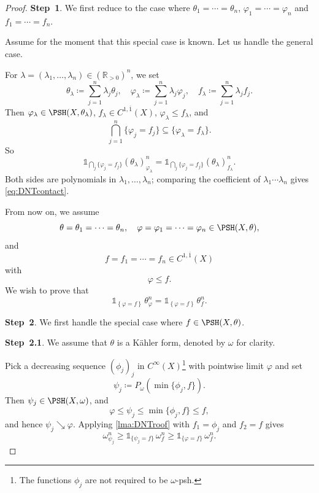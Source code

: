 \begin{proof}
    \textbf{Step~1}. We first reduce to the case where $\theta_1=\cdots=\theta_n$, $\varphi_1=\cdots=\varphi_n$ and $f_1=\cdots=f_n$.

    Assume for the moment that this special case is known. Let us handle the general case.

    For $\lambda=(\lambda_1,\dots,\lambda_n)\in(\mathbb{R}_{>0})^n$, we set
    \[
    \theta_\lambda\coloneqq \sum_{j=1}^n\lambda_j\theta_j,\quad \varphi_\lambda\coloneqq \sum_{j=1}^n\lambda_j\varphi_j,\quad f_\lambda\coloneqq \sum_{j=1}^n\lambda_j f_j.
    \]
    Then $\varphi_\lambda\in\PSH(X,\theta_\lambda)$, $f_\lambda\in C^{1,\overline{1}}(X)$, $\varphi_\lambda\leq f_\lambda$, and
    \[
        \bigcap_{j=1}^n\{\varphi_j=f_j\}\subseteq\{\varphi_\lambda=f_\lambda\}.
    \]
    So
    \[
        \mathds{1}_{\bigcap_j\{\varphi_j=f_j\}}(\theta_\lambda)^n_{\varphi_\lambda} = \mathds{1}_{\bigcap_j\{\varphi_j=f_j\}}(\theta_\lambda)^n_{f_\lambda}.
    \]
Both sides are polynomials in $\lambda_1,\dots,\lambda_n$; comparing the coefficient of $\lambda_1\cdots\lambda_n$ gives \eqref{eq:DNTcontact}.

From now on, we assume
\[
\theta=\theta_1=\dots=\theta_n,\quad
\varphi=\varphi_1=\cdots=\varphi_n\in \PSH(X,\theta),
\]
and
\[
f=f_1=\cdots=f_n\in C^{1,\overline{1}}(X)
\]
with
\[
\varphi\leq f.
\]
We wish to prove that
\begin{equation}\label{eq:DNT_temp1}
    \mathds{1}_{\left\{\varphi=f\right\}}\,\theta_{\varphi}^n=\mathds{1}_{\left\{\varphi=f\right\}}\,\theta_{f}^n.
\end{equation}

\textbf{Step~2}. We first handle the special case where $f\in \PSH(X,\theta)$.

\textbf{Step~2.1}. We assume that $\theta$ is a Kähler form, denoted by $\omega$ for clarity.

Pick a decreasing sequence $(\phi_j)_j$ in $C^{\infty}(X)$\footnote{The functions $\phi_j$ are not required to be $\omega$-psh.} with pointwise limit $\varphi$ and set
\[
\psi_j\coloneqq P_{\omega}\left(\min\{\phi_j,f\}\right).
\]
Then $\psi_j\in\PSH(X,\omega)$, and
\[
\varphi\leq\psi_j\leq\min\{\phi_j,f\} \leq f,
\]
and hence $\psi_j\searrow\varphi$.
Applying \cref{lma:DNTroof} with $f_1=\phi_j$ and $f_2=f$ gives
\begin{equation}\label{eq:omegapsij_temp1}
\omega^n_{\psi_j}\geq \mathds{1}_{\{\psi_j=f\}}\,\omega^n_f \geq \mathds{1}_{\{\varphi=f\}}\,\omega^n_f.
\end{equation}



\end{proof}
